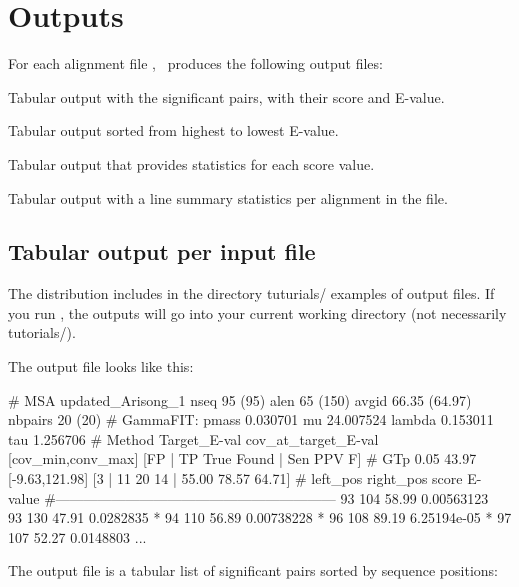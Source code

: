 \label{section:outputs}
\setcounter{footnote}{0}
\section{Outputs}

For each alignment file , \rscape\, produces the
following output files:

\begin{sreitems}{}
\item[\emprog{rnafile.out}] Tabular output with the significant pairs,
  with their score and E-value.
%
\item[\emprog{rnafile.sorted.out}] Tabular output sorted from highest to
  lowest E-value.
%
\item[\emprog{rnafile.roc}] Tabular output that provides statistics for 
each score value.
%
\item[\emprog{rnafile.sum}] Tabular output with a line summary statistics
  per alignment in the file.
%
\end{sreitems}

\subsection{Tabular output per input file}

The distribution includes in the directory tuturials/ examples of
output files. If you run \rscape, the outputs will go into your
current working directory (not necessarily tutorials/).

The output file  looks like this:

\begin{sreoutput}
# MSA updated_Arisong_1 nseq 95 (95) alen 65 (150) avgid 66.35 (64.97) nbpairs 20 (20)
# GammaFIT: pmass 0.030701 mu 24.007524 lambda 0.153011 tau 1.256706
# Method Target_E-val cov_at_target_E-val [cov_min,conv_max] [FP | TP True Found | Sen PPV F] 
# GTp    0.05         43.97               [-9.63,121.98]     [3 | 11 20 14 | 55.00 78.57 64.71] 
#       left_pos       right_pos        score   E-value
#------------------------------------------------------------
                93             104      58.99   0.00563123
~               93             130      47.91   0.0282835
*               94             110      56.89   0.00738228
*               96             108      89.19   6.25194e-05
*               97             107      52.27   0.0148803
...
\end{sreoutput}
The output file is a tabular list of significant pairs sorted by sequence positions:

